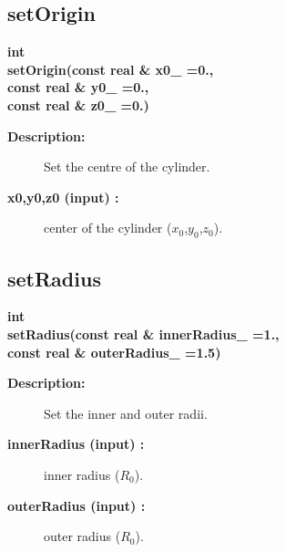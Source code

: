 \subsection{setOrigin}
 
\begin{flushleft} \textbf{%
int   \\ 
\settowidth{\CylinderMappingIncludeArgIndent}{setOrigin(}%
setOrigin(const real \& x0\_  =0., \\ 
\hspace{\CylinderMappingIncludeArgIndent}const real \& y0\_  =0., \\ 
\hspace{\CylinderMappingIncludeArgIndent}const real \& z0\_  =0.)
}\end{flushleft}
\begin{description}
\item[{\bf Description:}] 
    Set the centre of the cylinder.
\item[{\bf x0,y0,z0 (input) :}]  center of the cylinder ($x_0$,$y_0$,$z_0$).
\end{description}
\subsection{setRadius}
 
\begin{flushleft} \textbf{%
int   \\ 
\settowidth{\CylinderMappingIncludeArgIndent}{setRadius(}%
setRadius(const real \& innerRadius\_  =1.,\\ 
\hspace{\CylinderMappingIncludeArgIndent}const real \& outerRadius\_  =1.5)
}\end{flushleft}
\begin{description}
\item[{\bf Description:}] 
    Set the inner and outer radii.
\item[{\bf innerRadius (input) :}]  inner radius ($R_0$).
\item[{\bf outerRadius (input) :}]  outer radius ($R_0$).
\end{description}
